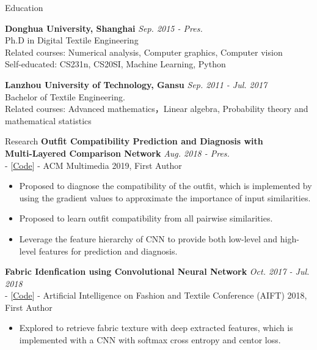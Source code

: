 \documentclass{resume} %
\begin{document}

\begin{rSection}{Education}

{\bf Donghua University, Shanghai} \hfill {\em Sep. 2015 - Pres.} 
\\ Ph.D in Digital Textile Engineering
\\ Related courses: Numerical analysis, Computer graphics, Computer vision
\\ Self-educated: CS231n, CS20SI, Machine Learning, Python

{\bf Lanzhou University of Technology, Gansu} \hfill {\em Sep. 2011 - Jul. 2017} 
\\ Bachelor of Textile Engineering.
\\ Related courses: Advanced mathematics，Linear algebra, Probability theory and mathematical statistics


\end{rSection}
\begin{rSection}{Research}
{\bf Outfit Compatibility Prediction and Diagnosis with \\ Multi-Layered Comparison Network} \hfill {\em Aug. 2018 - Pres.}
\\ - [\href{https://github.com/WangXin93/fashion_compatibility_mcn}{Code}] - ACM Multimedia 2019, First Author
\begin{itemize}
    \item Proposed to diagnose the compatibility of the outfit, which is implemented by using the gradient values to approximate the importance of input similarities.
    \item Proposed to learn outfit compatibility from all pairwise similarities.
    \item Leverage the feature hierarchy of CNN to provide both low-level and high-level features for prediction and diagnosis.
\end{itemize}

{\bf Fabric Idenfication using Convolutional Neural Network} \hfill {\em Oct. 2017 - Jul. 2018}
\\ - [\href{https://github.com/WangXin93/FabricID}{Code}] - Artificial Intelligence on Fashion and Textile Conference (AIFT) 2018, First Author
\begin{itemize}
    \item Explored to retrieve fabric texture with deep extracted features, which is implemented with a CNN with softmax cross entropy and centor loss.
\end{itemize}

\end{rSection}
\end{document}
